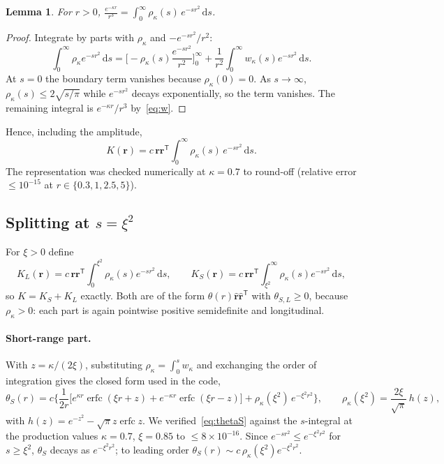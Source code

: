 \documentclass[11pt]{article}
\DeclareRobustCommand{\_}{\textunderscore\allowbreak}
\newtheorem{lemma}[proposition]{Lemma}
\theoremstyle{remark}
\theoremstyle{definition}
\newcommand{\br}{\mathbf{r}}
\newcommand{\rhat}{\hat{\mathbf{r}}}
\newcommand{\dd}{\,\mathrm{d}}
\newcommand{\erfc}{\operatorname{erfc}}
\begin{document}
\begin{lemma}\label{lem:ibp}
For $r>0$, $\displaystyle\frac{e^{-\kappa r}}{r^3}=\int_0^\infty\rho_\kappa(s)\,e^{-sr^2}\dd s$.
\end{lemma}
\begin{proof}
Integrate by parts with $\rho_\kappa$ and $-e^{-sr^2}/r^2$:
\[
\int_0^\infty\rho_\kappa e^{-sr^2}\dd s
=\Big[-\rho_\kappa(s)\frac{e^{-sr^2}}{r^2}\Big]_0^\infty+\frac1{r^2}\int_0^\infty w_\kappa(s)e^{-sr^2}\dd s .
\]
At $s=0$ the boundary term vanishes because $\rho_\kappa(0)=0$. As $s\to\infty$, $\rho_\kappa(s)\le2\sqrt{s/\pi}$ while
$e^{-sr^2}$ decays exponentially, so the term vanishes. The remaining integral is $e^{-\kappa r}/r^3$
by~\eqref{eq:w}.
\end{proof}

Hence, including the amplitude,
\begin{equation}\label{eq:Krep}
K(\br)=c\,\br\br^{\mathsf T}\int_0^\infty\rho_\kappa(s)\,e^{-sr^2}\dd s .
\end{equation}
The representation was checked numerically at $\kappa=0.7$ to round-off (relative error $\le10^{-15}$ at
$r\in\{0.3,1,2.5,5\}$).

\subsection{Splitting at \texorpdfstring{$s=\xi^2$}{s = xi\textasciicircum 2}}

For $\xi>0$ define
\begin{equation}\label{eq:split}
K_L(\br)=c\,\br\br^{\mathsf T}\int_0^{\xi^2}\rho_\kappa(s)e^{-sr^2}\dd s,\qquad
K_S(\br)=c\,\br\br^{\mathsf T}\int_{\xi^2}^\infty\rho_\kappa(s)e^{-sr^2}\dd s,
\end{equation}
so $K=K_S+K_L$ exactly. Both are of the form $\theta(r)\rhat\rhat^{\mathsf T}$ with $\theta_{S,L}\ge0$, because
$\rho_\kappa>0$: each part is again pointwise positive semidefinite and longitudinal.

\paragraph{Short-range part.}
With $z=\kappa/(2\xi)$, substituting $\rho_\kappa=\int_0^sw_\kappa$ and exchanging the order of integration gives the
closed form used in the code,
\begin{equation}\label{eq:thetaS}
\theta_S(r)=c\Big\{\frac{1}{2r}\big[e^{\kappa r}\erfc(\xi r+z)+e^{-\kappa r}\erfc(\xi r-z)\big]+\rho_\kappa(\xi^2)\,e^{-\xi^2r^2}\Big\},
\qquad \rho_\kappa(\xi^2)=\frac{2\xi}{\sqrt\pi}\,h(z),
\end{equation}
with $h(z)=e^{-z^2}-\sqrt\pi z\erfc z$. We verified~\eqref{eq:thetaS} against the $s$-integral at the production
values $\kappa=0.7$, $\xi=0.85$ to $\le8\times10^{-16}$. Since $e^{-sr^2}\le e^{-\xi^2r^2}$ for $s\ge\xi^2$,
$\theta_S$ decays as $e^{-\xi^2r^2}$; to leading order $\theta_S(r)\sim c\,\rho_\kappa(\xi^2)e^{-\xi^2r^2}$.
\end{document}
